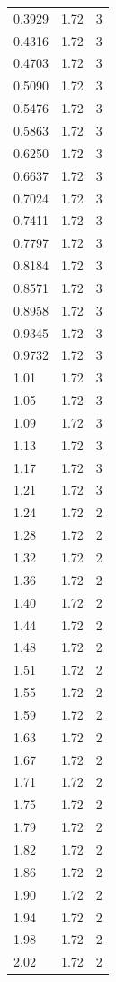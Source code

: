 \begin{longtable}{lrr}
  0.3929 & 1.72 & 3 \\
  0.4316 & 1.72 & 3 \\
  0.4703 & 1.72 & 3 \\
  0.5090 & 1.72 & 3 \\
  0.5476 & 1.72 & 3 \\
  0.5863 & 1.72 & 3 \\
  0.6250 & 1.72 & 3 \\
  0.6637 & 1.72 & 3 \\
  0.7024 & 1.72 & 3 \\
  0.7411 & 1.72 & 3 \\
  0.7797 & 1.72 & 3 \\
  0.8184 & 1.72 & 3 \\
  0.8571 & 1.72 & 3 \\
  0.8958 & 1.72 & 3 \\
  0.9345 & 1.72 & 3 \\
  0.9732 & 1.72 & 3 \\
  1.01 & 1.72 & 3 \\
  1.05 & 1.72 & 3 \\
  1.09 & 1.72 & 3 \\
  1.13 & 1.72 & 3 \\
  1.17 & 1.72 & 3 \\
  1.21 & 1.72 & 3 \\
  1.24 & 1.72 & 2 \\
  1.28 & 1.72 & 2 \\
  1.32 & 1.72 & 2 \\
  1.36 & 1.72 & 2 \\
  1.40 & 1.72 & 2 \\
  1.44 & 1.72 & 2 \\
  1.48 & 1.72 & 2 \\
  1.51 & 1.72 & 2 \\
  1.55 & 1.72 & 2 \\
  1.59 & 1.72 & 2 \\
  1.63 & 1.72 & 2 \\
  1.67 & 1.72 & 2 \\
  1.71 & 1.72 & 2 \\
  1.75 & 1.72 & 2 \\
  1.79 & 1.72 & 2 \\
  1.82 & 1.72 & 2 \\
  1.86 & 1.72 & 2 \\
  1.90 & 1.72 & 2 \\
  1.94 & 1.72 & 2 \\
  1.98 & 1.72 & 2 \\
  2.02 & 1.72 & 2 \\

\end{longtable}
